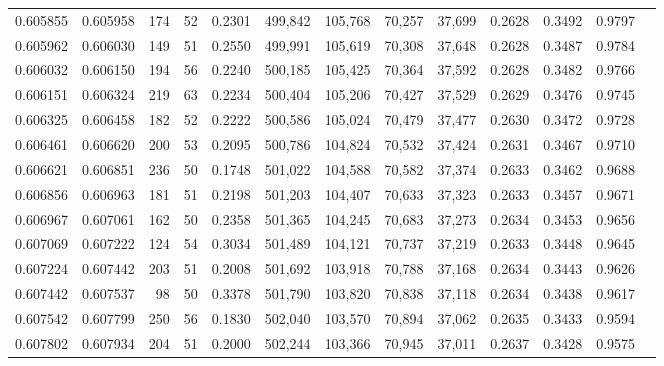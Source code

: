 \begin{tabular}{rrrrrrrrrrrrr}
0.605855 & 0.605958 &   174 &  52 &                                     0.2301 & 499,842 & 105,768 &  70,257 &  37,699 & 0.2628 & 0.3492 & 0.9797 \\
0.605962 & 0.606030 &   149 &  51 &                                     0.2550 & 499,991 & 105,619 &  70,308 &  37,648 & 0.2628 & 0.3487 & 0.9784 \\
0.606032 & 0.606150 &   194 &  56 &                                     0.2240 & 500,185 & 105,425 &  70,364 &  37,592 & 0.2628 & 0.3482 & 0.9766 \\
0.606151 & 0.606324 &   219 &  63 &                                     0.2234 & 500,404 & 105,206 &  70,427 &  37,529 & 0.2629 & 0.3476 & 0.9745 \\
0.606325 & 0.606458 &   182 &  52 &                                     0.2222 & 500,586 & 105,024 &  70,479 &  37,477 & 0.2630 & 0.3472 & 0.9728 \\
0.606461 & 0.606620 &   200 &  53 &                                     0.2095 & 500,786 & 104,824 &  70,532 &  37,424 & 0.2631 & 0.3467 & 0.9710 \\
0.606621 & 0.606851 &   236 &  50 &                                     0.1748 & 501,022 & 104,588 &  70,582 &  37,374 & 0.2633 & 0.3462 & 0.9688 \\
0.606856 & 0.606963 &   181 &  51 &                                     0.2198 & 501,203 & 104,407 &  70,633 &  37,323 & 0.2633 & 0.3457 & 0.9671 \\
0.606967 & 0.607061 &   162 &  50 &                                     0.2358 & 501,365 & 104,245 &  70,683 &  37,273 & 0.2634 & 0.3453 & 0.9656 \\
0.607069 & 0.607222 &   124 &  54 &                                     0.3034 & 501,489 & 104,121 &  70,737 &  37,219 & 0.2633 & 0.3448 & 0.9645 \\
0.607224 & 0.607442 &   203 &  51 &                                     0.2008 & 501,692 & 103,918 &  70,788 &  37,168 & 0.2634 & 0.3443 & 0.9626 \\
0.607442 & 0.607537 &    98 &  50 &                                     0.3378 & 501,790 & 103,820 &  70,838 &  37,118 & 0.2634 & 0.3438 & 0.9617 \\
0.607542 & 0.607799 &   250 &  56 &                                     0.1830 & 502,040 & 103,570 &  70,894 &  37,062 & 0.2635 & 0.3433 & 0.9594 \\
0.607802 & 0.607934 &   204 &  51 &                                     0.2000 & 502,244 & 103,366 &  70,945 &  37,011 & 0.2637 & 0.3428 & 0.9575 \\

\end{tabular}
